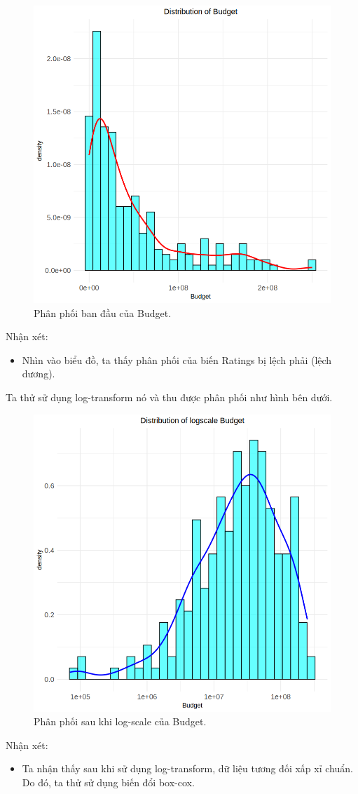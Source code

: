 \begin{figure}[H]
    \centering
    \includegraphics[width=0.75\columnwidth]{csm_figures/budget_original_distribution.png}
    \caption{Phân phối ban đầu của Budget.}
    \label{fig:budget_original_distribution}
\end{figure}

Nhận xét:
\begin{itemize}
    \item Nhìn vào biểu đồ, ta thấy phân phối của biến Ratings bị lệch phải (lệch dương).
\end{itemize}

Ta thử sử dụng log-transform nó và thu được phân phối như hình bên dưới.

\begin{figure}[H]
    \centering
    \includegraphics[width=0.75\columnwidth]{csm_figures/budget_logscale_distribution.png}
    \caption{Phân phối sau khi log-scale của Budget.}
    \label{fig:budget_logscale_distribution}
\end{figure}
Nhận xét:
\begin{itemize}
    \item Ta nhận thấy sau khi sử dụng log-transform, dữ liệu tương đối xấp xỉ chuẩn. Do đó, ta thử sử dụng biến đổi box-cox.
\end{itemize}

